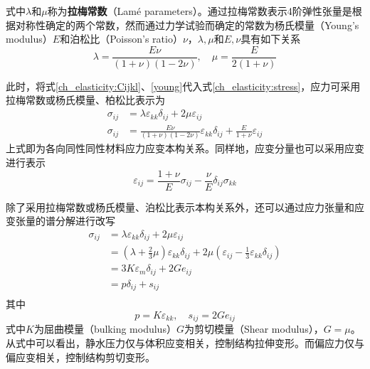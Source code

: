 式中$\lambda$和$\mu$称为\textbf{拉梅常数}（Lamé parameters）。通过拉梅常数表示4阶弹性张量是根据对称性确定的两个常数，然而通过力学试验而确定的常数为杨氏模量（Young's modulus）$E$和泊松比（Poisson's ratio）$\nu$，$\lambda,\mu$和$E,\nu$具有如下关系
\begin{equation}\label{young}
\lambda = \frac{E\nu}{(1+\nu)(1-2\nu)},\quad \mu = \frac{E}{2(1+\nu)}
\end{equation}\par
此时，将式\eqref{ch_elasticity:Cijkl}、\eqref{young}代入式\eqref{ch_elasticity:stress}，应力可采用拉梅常数或杨氏模量、柏松比表示为
\begin{subequations}\label{ch_elasticity:stress1}
\begin{align}
    \sigma_{ij} &= \lambda \varepsilon_{kk}\delta_{ij}  + 2\mu \varepsilon_{ij} \\
    \sigma_{ij} &= \frac{E\nu}{(1+\nu)(1-2\nu)} \varepsilon_{kk}\delta_{ij}  + \frac{E}{1+\nu} \varepsilon_{ij}
\end{align}
\end{subequations}
上式即为各向同性同性材料应力应变本构关系。同样地，应变分量也可以采用应变进行表示
\begin{equation}
\varepsilon_{ij} = \frac{1+\nu}{E}\sigma_{ij} - \frac{\nu}{E}\delta_{ij}\sigma_{kk}
\end{equation}\par
除了采用拉梅常数或杨氏模量、泊松比表示本构关系外，还可以通过应力张量和应变张量的谱分解进行改写
\begin{equation}
\begin{split}
    \sigma_{ij} &= \lambda \varepsilon_{kk}\delta_{ij} + 2\mu \varepsilon_{ij} \\
                &= (\lambda+\frac{2}{3}\mu) \varepsilon_{kk}\delta_{ij} + 2\mu (\varepsilon_{ij}-\frac{1}{3}\varepsilon_{kk}\delta_{ij}) \\
                &= 3K \varepsilon_m\delta_{ij} + 2G e_{ij} \\
                &= p\delta_{ij} + s_{ij} \\
\end{split}
\end{equation}
其中
\begin{equation}
p = K \varepsilon_{kk}, \quad s_{ij} = 2G e_{ij}
\end{equation}
式中$K$为屈曲模量（bulking modulus）$G$为剪切模量（Shear modulus），$G=\mu$。从式中可以看出，静水压力仅与体积应变相关，控制结构拉伸变形。而偏应力仅与偏应变相关，控制结构剪切变形。\par
